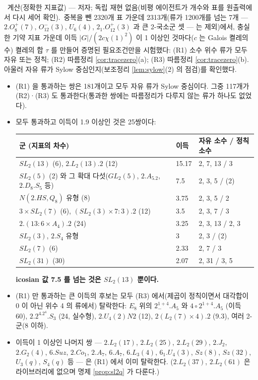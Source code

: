 \begin{observation}\label{obs:gapscan}\ 계산(정확한 지표값) --- 저자; 독립 재현 없음(비평 에이전트가 개수와 표를 원출력에서 다시 세어 확인).\
중복을 뺀 2320개 표 가운데 2313개(류가 1200개를 넘는 7개 --- $2.O_8^+(7)$, $O_{12}^-(3)$, $U_6(4)$, $2_1.O_{12}^+(3)$ 과 큰 2-국소군 셋 --- 는 제외)에서, 충실한 기약 지표 가운데 이득 $|G|/(2c\chi(1)^2)$ 이 1 이상인 것마다($c$ 는 Galois 켤레의 수) 켤레의 합 $\tau$ 를 만들어 증명된 필요조건만을 시험했다: (R1) 소수 위수 류가 모두 자유 또는 정칙; (R2) 따름정리 \ref{cor:tracezero}(a); (R3) 따름정리 \ref{cor:tracezero}(b). 아울러 자유 류가 Sylow 중심인지(보조정리 \ref{lem:sylow}(2) 의 점검)를 확인했다.
\begin{itemize}
\item (R1) 을 통과하는 쌍은 181개이고 모두 자유 류가 Sylow 중심이다. 그중 117개가 (R2)·(R3) 도 통과한다(통과한 쌍에는 따름정리가 다루지 않는 류가 하나도 없었다).
\item 모두 통과하고 이득이 1.9 이상인 것은 25쌍이다:
\begin{center}\small
\begin{tabular}{@{}lll@{}}
\toprule
군 (지표의 차수) & 이득 & 자유 소수 / 정칙 소수\\
\midrule
$SL_2(13)$ (6), $2.L_2(13).2$ (12) & 15.17 & 2, 7, 13 / 3\\
$SL_2(5)$ (2) 와 그 확대 다섯($GL_2(5)$, $2.A_5.2$, $2.D_8.S_5$ 등) & 7.5 & 2, 3, 5 / (2)\\
$N(2.HS,Q_8)$ 유형 (8) & 3.75 & 2, 3, 5 / 2\\
$3\times SL_2(7)$ (6), $(SL_2(3)\times7{:}3).2$ (12) & 3.5 & 2, 3, 7 / 3\\
$2.(13{:}6\times A_4).2$ (24) & 3.25 & 2, 3, 13 / 2, 3\\
$SL_2(3)$, $2.S_4$ 유형 & 3 & 2, 3 / (2)\\
$SL_2(7)$ (6) & 2.33 & 2, 7 / 3\\
$SL_2(31)$ (30) & 2.07 & 2, 31 / 3, 5\\
\bottomrule
\end{tabular}
\end{center}
\textbf{icosian 값 7.5 를 넘는 것은 $SL_2(13)$ 뿐이다.}
\item (R1) 만 통과하는 큰 이득의 후보는 모두 (R3) 에서(제곱이 정칙이면서 대각합이 0 이 아닌 위수 4 의 류에서) 탈락한다: $E_8$ 위의 $2^{1+4}_-.A_5$ 와 $4\circ2^{1+4}.A_5$ (이득 60), $2.2^4.2^4.S_3$ (24, 실수형), $2.U_4(2)N2$ (12), $2(L_2(7)\times4).2$ (9.3), 여러 2-군(8 이하).
\item 이득이 1 이상인 나머지 쌍 --- $2.L_2(17)$, $2.L_2(25)$, $2.L_2(29)$, $2.J_2$, $2.G_2(4)$, $6.Suz$, $2.Co_1$, $2.A_7$, $6.A_7$, $6.L_3(4)$, $6_1.U_4(3)$, $Sz(8)$, $Sz(32)$, $U_3(q)$, $S_4(q)$ 등 --- 은 (R1) 에서 이미 탈락한다. ($2.L_2(37)$, $2.L_2(61)$ 은 라이브러리에 없으며 명제 \ref{prop:sl2q} 가 다룬다.)
\end{itemize}
\end{observation}

